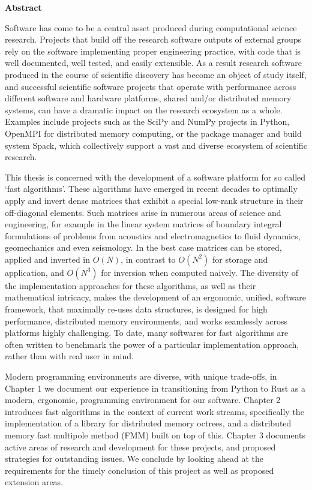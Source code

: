 \thispagestyle{plain}

\begin{center}
    \textbf{Abstract}
\end{center}

Software has come to be a central asset produced during
computational science research. Projects that build off the research software outputs of external
groups rely on the software implementing proper engineering practice,
with code that is well documented, well tested, and easily extensible. As a
result research software produced in the course of scientific discovery has
become an object of study itself, and successful scientific software projects
that operate with performance across different software and hardware platforms,
shared and/or distributed memory systems, can have a dramatic impact on the
research ecosystem as a whole. Examples include projects such as the SciPy and
NumPy projects in Python, OpenMPI for distributed memory computing, or the package
manager and build system Spack, which collectively support a vast and diverse ecosystem of scientific
research.

This thesis is concerned with the development of a software platform
for so called `fast algorithms'. These algorithms have emerged in recent decades to
optimally apply and invert dense matrices that exhibit
a special low-rank structure in their off-diagonal elements. Such matrices arise
in numerous areas of science and engineering, for example in the linear system
matrices of boundary integral formulations of problems from acoustics and
electromagnetics to fluid dynamics, geomechanics and even seismology. In the
best case matrices can be stored, applied and inverted in $O(N)$, in contrast
to $O(N^2)$ for storage and application, and $O(N^3)$ for inversion when computed
naively. The diversity of the implementation approaches for these algorithms, as
well as their mathematical intricacy, makes the development of an ergonomic,
unified, software framework, that maximally re-uses data structures, is designed
for high performance, distributed memory environments, and works seamlessly
across platforms highly challenging. To date, many softwares for fast algorithms
are often written to benchmark the power of a particular implementation approach,
rather than with real user in mind.

 Modern programming environments are diverse, with unique trade-offs, in Chapter 1 we document our experience in transitioning from Python to Rust as a
modern, ergonomic, programming environment for our software. Chapter 2 introduces
fast algorithms in the context of current work streams, specifically the
implementation of a library for distributed memory octrees, and a distributed memory fast
multipole method (FMM) built on top of this. Chapter 3 documents active areas
of research and development for these projects, and proposed strategies for
outstanding issues. We conclude by looking ahead at the requirements for the
timely conclusion of this project as well as proposed extension areas.
